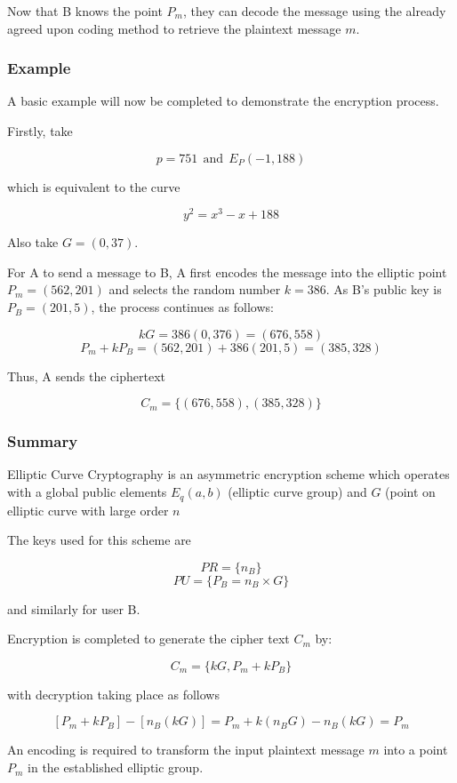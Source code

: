\documentclass[a4paper,10pt]{report}
\begin{document}
Now that B knows the point $P_{m}$, they can decode the message using the already agreed upon coding method to retrieve the plaintext message $m$.

\subsubsection{Example}

A basic example will now be completed to demonstrate the encryption process. 

Firstly, take 

\[p = 751 \: \: \mathrm{and} \: \: E_{P}(-1,188)\]

which is equivalent to the curve 

\[y^2 = x^3 - x + 188\]

 Also take $G = (0,37)$.

For A to send a message to B, A first encodes the message into the elliptic point $P_{m} = (562,201)$ and selects the random number $k = 386$. As B's public key is $P_{B} = (201,5)$, the process continues as follows:

\[ kG = 386(0,376) = (676,558) \]
\[ P_{m} + kP_{B} = (562,201) + 386(201,5) = (385,328) \]

Thus, A sends the ciphertext

\[ C_{m} = \{(676,558),(385,328)\} \]

\subsubsection{Summary}

Elliptic Curve Cryptography is an asymmetric encryption scheme which operates with a global public elements $E_{q}(a,b)$ (elliptic curve group) and $G$ (point on elliptic curve with large order $n$

The keys used for this scheme are

\[PR = \{n_{B}\} \]\[PU = \{P_{B} = n_{B} \times G\} \]

and similarly for user B.

Encryption is completed to generate the cipher text $C_{m}$ by:

\[ C_{m} = \{kG , P_{m} + kP_{B}\} \]

with decryption taking place as follows

\[ [P_{m} + kP_{B}] - [n_{B}(kG)] = P_{m} + k(n_{B}G) - n_{B}(kG) = P_{m} \]

An encoding is required to transform the input plaintext message $m$ into a point $P_{m}$ in the established elliptic group.
\end{document}
